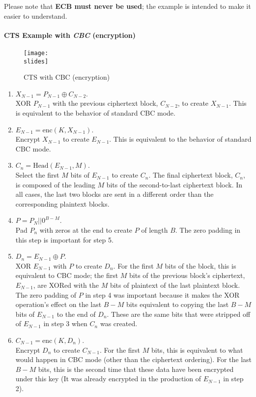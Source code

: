 Please note that \textbf{ECB must never be used}; the example is intended to make it easier to understand.

\paragraph*{CTS Example with \textit{CBC} (encryption)}
\begin{figure}[H]
    \centering
    \texttt{[image: \\slides]}
    \caption{CTS with CBC (encryption)}
\end{figure}
\begin{enumerate}
    \item $X_{N-1} = P_{N-1} \oplus C_{N-2}$. \\
    XOR $P_{N-1}$ with the previous ciphertext block, $C_{N-2}$, to create $X_{N-1}$. This is equivalent to the behavior of standard CBC mode.
    \item $E_{N-1} = \text{enc}(K, X_{N-1})$.\\
    Encrypt $X_{N-1}$ to create $E_{N-1}$. This is equivalent to the behavior of standard CBC mode.
    \item $C_n = \text{Head}(E_{N-1}, M)$.\\
    Select the first $M$ bits of $E_{N-1}$ to create $C_n$. The final ciphertext block, $C_n$, is composed of the leading $M$ bits of the second-to-last ciphertext block. In all cases, the last two blocks are sent in a different order than the corresponding plaintext blocks.
    \item $P = P_{N} || 0^{B-M}$.\\
    Pad $P_n$ with zeros at the end to create $P$ of length $B$. The zero padding in this step is important for step 5.
    \item $D_n = E_{N-1} \oplus P$.\\
    XOR $E_{N-1}$ with $P$ to create $D_n$. For the first $M$ bits of the block, this is equivalent to CBC mode; the first $M$ bits of the previous block's ciphertext, $E_{N-1}$, are XORed with the $M$ bits of plaintext of the last plaintext block. The zero padding of $P$ in step 4 was important because it makes the XOR operation's effect on the last $B-M$ bits equivalent to copying the last $B-M$ bits of $E_{N-1}$ to the end of $D_n$. These are the same bits that were stripped off of $E_{N-1}$ in step 3 when $C_n$ was created.
    \item $C_{N-1} = \text{enc}(K, D_n)$.\\
    Encrypt $D_n$ to create $C_{N-1}$. For the first $M$ bits, this is equivalent to what would happen in CBC mode (other than the ciphertext ordering). For the last $B-M$ bits, this is the second time that these data have been encrypted under this key (It was already encrypted in the production of $E_{N-1}$ in step 2).
\end{enumerate}



